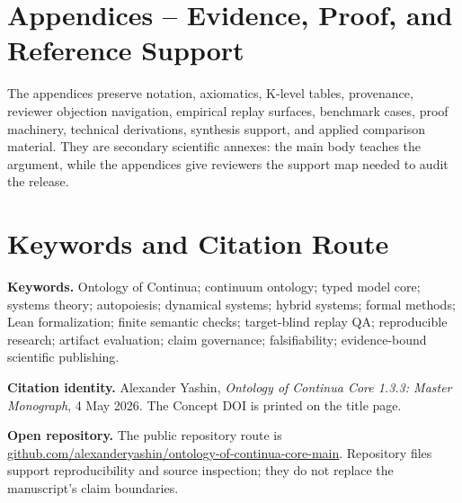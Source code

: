 \documentclass[11pt,a4paper]{article}
\begin{document}
\section*{Appendices -- Evidence, Proof, and Reference Support}
The appendices preserve notation, axiomatics, K-level tables, provenance,
reviewer objection navigation, empirical replay surfaces, benchmark cases,
proof machinery, technical derivations, synthesis support, and applied
comparison material. They are secondary scientific annexes: the main body
teaches the argument, while the appendices give reviewers the support map
needed to audit the release.





















\clearpage
\clearpage
\section*{Keywords and Citation Route}
\noindent\textbf{Keywords.} Ontology of Continua; continuum ontology; typed model core; systems theory; autopoiesis; dynamical systems; hybrid systems; formal methods; Lean formalization; finite semantic checks; target-blind replay QA; reproducible research; artifact evaluation; claim governance; falsifiability; evidence-bound scientific publishing.

\medskip
\noindent\textbf{Citation identity.} Alexander Yashin, \emph{Ontology of Continua Core 1.3.3: Master Monograph}, 4 May 2026. The Concept DOI is printed on the title page.

\medskip
\noindent\textbf{Open repository.} The public repository route is \href{https://github.com/alexanderyashin/ontology-of-continua-core-main}{github.com/alexanderyashin/ontology-of-continua-core-main}. Repository files support reproducibility and source inspection; they do not replace the manuscript's claim boundaries.


\clearpage
\nocite{*}
\printbibliography[heading=bibintoc,title={Bibliography}]
\end{document}
